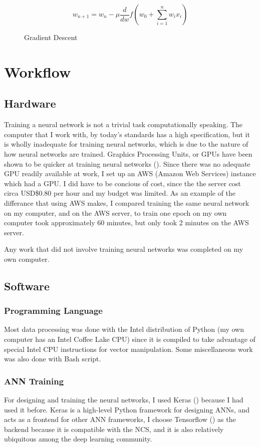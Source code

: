           \begin{figure}[h]
            \[
                w_{n+1}=w_n-\mu \frac{d}{dw}f(w_0+\sum_{i=1}^nw_ix_i)
            \]
            \caption{Gradient Descent}
            \label{fig:gradientdescent}
            \end{figure}

\section{Workflow}
    \subsection{Hardware}
    Training a neural network is not a trivial task computationally speaking. The computer that I work with, by today's standards has a high specification, but it is wholly inadequate for training neural networks, which is due to the nature of how neural networks are trained. Graphics Processing Units, or GPUs have been shown to be quicker at training neural networks (\cite{OH20041311}). Since there was no adequate GPU readily available at work, I set up an AWS (Amazon Web Services) instance which had a GPU. I did have to be concious of cost, since the the server cost circa USD\$0.80 per hour and my budget was limited. As an example of the differance that using AWS makes, I compared training the same neural network on my computer, and on the AWS server, to train one epoch on my own computer took approximately 60 minutes, but only took 2 minutes on the AWS server.

    Any work that did not involve training neural networks was completed on my own computer.

    \subsection{Software}
        \subsubsection{Programming Language}
        Most data processing was done with the Intel distribution of Python (my own computer has an Intel Coffee Lake CPU) since it is compiled to take advantage of special Intel CPU instructions for vector manipulation. Some miscellaneous work was also done with Bash script.

        \subsubsection{ANN Training}
        For designing and training the neural networks, I used Keras (\cite{chollet2015keras}) because I had used it before. Keras is a high-level Python framework for designing ANNs, and acts as a frontend for other ANN frameworks, I choose Tensorflow (\cite{tensorflow2015-whitepaper}) as the backend because it is compatible with the NCS, and it is also relatively ubiquitous among the deep learning community.

